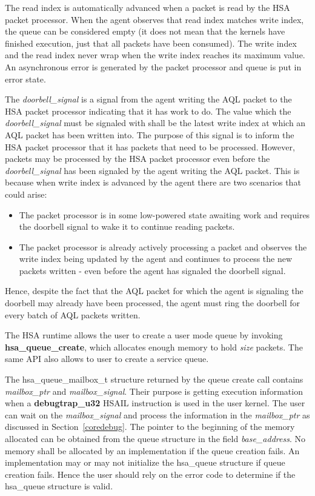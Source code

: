 \documentclass[draft]{book}
\newcommand{\mariotodo}[1]{\todo[color=CarnationPink]{#1}}
\newcommand{\reffun}[1]{\textbf{#1}}
\newcommand{\refarg}[1]{\textit{#1}}
\newcommand{\reffld}[1]{\textit{#1}}
\newcommand{\reftyp}[1]{#1}
\newcommand{\refhsl}[1]{\reffun{#1}}
\begin{document}
The read index is automatically advanced when a packet is read by the HSA packet
processor. When the agent observes that read index matches write index, the
queue can be considered empty (it does not mean that the kernels have finished
execution, just that all packets have been consumed). The write index and the
read index never wrap when the write index reaches its maximum value. An
asynchronous error is generated by the packet processor and queue is put in
error state.

The \reffld{doorbell_signal} is a signal from the agent writing the AQL packet
to the HSA packet processor indicating that it has work to do. The value which
the \reffld{doorbell_signal} must be signaled with shall be the latest write
index at which an AQL packet has been written into. The purpose of this signal
is to inform the HSA packet processor that it has packets that need to be
processed. However, packets may be processed by the HSA packet processor even
before the \reffld{doorbell_signal} has been signaled by the agent writing the
AQL packet. This is because when write index is advanced by the agent there are
two scenarios that could arise:
\vspace{-2mm}\begin{itemize}
\item The packet processor is in some low-powered state awaiting work and
  requires the doorbell signal to wake it to continue reading packets.
\item The packet processor is already actively processing a packet and
  observes the write index being updated by the agent and continues to process
  the new packets written - even before the agent has signaled the
  doorbell signal.
\end{itemize}
Hence, despite the fact that the AQL packet for which the agent is signaling the
doorbell may already have been processed, the agent must ring the doorbell for
every batch of AQL packets written.

The HSA runtime allows the user to create a user mode queue by invoking
\reffun{hsa_queue_create}, which allocates enough memory to hold \refarg{size}
packets. The same API also allows to user to create a service queue.

\mariotodo{I do not understand this paragraph}The \reftyp{hsa_queue_mailbox_t}
structure returned by the queue create call contains \reffld{mailbox_ptr} and
\reffld{mailbox_signal}. Their purpose is getting execution information when a
\refhsl{debugtrap_u32} HSAIL instruction is used in the user kernel. The user
can wait on the \reffld{mailbox_signal} and process the information in the
\reffld{mailbox_ptr} as discussed in Section~\ref{coredebug}. The pointer to the
beginning of the memory allocated can be obtained from the queue structure in
the field \reffld{base_address}. No memory shall be allocated by an
implementation if the queue creation fails. An implementation may or may not
initialize the \reftyp{hsa_queue} structure if queue creation fails. Hence the
user should rely on the error code to determine if the \reftyp{hsa_queue}
structure is valid.
\end{document}
